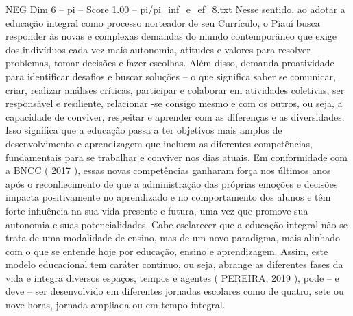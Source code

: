 \begin{textsample}{NEG Dim 6 – pi – Score 1.00 – pi/pi\_inf\_e\_ef\_8.txt}
Nesse sentido, ao adotar a educação integral como processo norteador de seu Currículo, o Piauí busca responder às novas e complexas demandas do mundo contemporâneo que exige dos indivíduos cada vez mais autonomia, atitudes e valores para resolver problemas, tomar decisões e fazer escolhas.
Além disso, demanda proatividade para identificar desafios e buscar soluções – o que significa saber se comunicar, criar, realizar análises críticas, participar e colaborar em atividades coletivas, ser responsável e resiliente, relacionar -se consigo mesmo e com os outros, ou seja, a capacidade de conviver, respeitar e aprender com as diferenças e as diversidades.
Isso significa que a educação passa a ter objetivos mais amplos de desenvolvimento e aprendizagem que incluem as diferentes competências, fundamentais para se trabalhar e conviver nos dias atuais.
Em conformidade com a BNCC ( 2017 ), essas novas competências ganharam força nos últimos anos após o reconhecimento de que a administração das próprias emoções e decisões impacta positivamente no aprendizado e no comportamento dos alunos e têm forte influência na sua vida presente e futura, uma vez que promove sua autonomia e suas potencialidades.
Cabe esclarecer que a educação integral não se trata de uma modalidade de ensino, mas de um novo paradigma, mais alinhado com o que se entende hoje por educação, ensino e aprendizagem.
Assim, este modelo educacional tem caráter contínuo, ou seja, abrange as diferentes fases da vida e integra diversos espaços, tempos e agentes ( PEREIRA, 2019 ), pode – e deve – ser desenvolvido em diferentes jornadas escolares como de quatro, sete ou nove horas, jornada ampliada ou em tempo integral.

\end{textsample}
